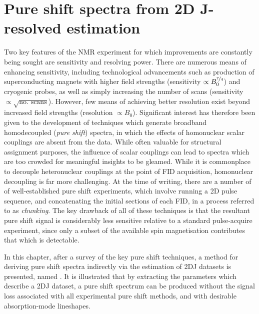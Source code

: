 \chapter{Pure shift spectra from 2D J-resolved estimation}
\label{chap:cupid}
Two key features of the \ac{NMR} experiment for which improvements are
constantly being sought are sensitivity and resolving power. There are numerous
means of enhancing sensitivity, including technological advancements such as
production of superconducting magnets with higher field
strengths\cite{Maeda2019} (sensitivity $\propto B_0^{\nicefrac{7}{4}}$) and
cryogenic probes\cite{Kovacs2020}, as well as simply
increasing the number of scans (sensitivity $\propto \sqrt{\text{no. scans}}$).
However, few means of achieving better resolution exist beyond increased field
strengths (resolution $\propto B_0$). Significant interest has therefore been
given to the development of techniques which generate broadband homodecoupled
(\emph{pure shift}) spectra, in which the effects of homonuclear scalar
couplings are absent from the data. While often valuable for structural
assignment purposes, the influence of scalar couplings can lead to spectra
which are too crowded for meaningful insights to be gleamed. While it is
commonplace to decouple heteronuclear couplings at the point of \ac{FID}
acquisition\cite{Shaka1983a, Shaka1983b,Shaka1985}, homonuclear decoupling is
far more challenging. At the time of writing, there are a number of of
well-established pure shift experiments, which involve running a \ac{2D} pulse
sequence, and concatenating the initial sections of each \ac{FID}, in a process
referred to as \emph{chunking}\cite{Meyer2013,Adams2014,Zangger2015}. The key
drawback of all of these techniques is that the resultant pure shift signal is
considerably less sensitive relative to a standard pulse-acquire experiment,
since only a subset of the available spin magnetisation contributes that which
is detectable.

In this chapter, after a survey of the key pure shift techniques, a method for
deriving pure shift spectra indirectly via the estimation of \ac{2DJ} datasets
is presented, named . It is illustrated that by extracting the
parameters which describe a \ac{2DJ} dataset, a pure shift spectrum can be
produced without the signal loss associated with all experimental pure shift
methods, and with desirable absorption-mode lineshapes.





